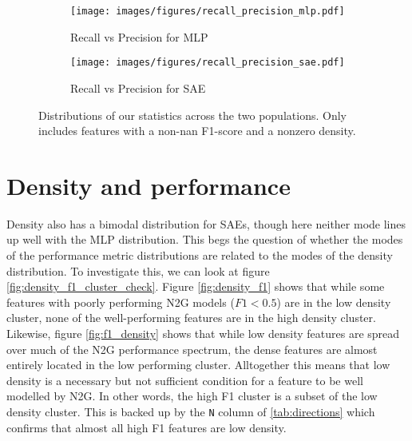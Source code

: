 \begin{figure}[h]
    \centering
    
    \begin{subfigure}[b]{0.45\textwidth}
        \centering
        \texttt{[image: images/figures/recall\_precision\_mlp.pdf]}
        \caption{Recall vs Precision for MLP}
        \label{fig:recall_precision_mlp}
    \end{subfigure}
    \begin{subfigure}[b]{0.45\textwidth}
        \centering
        \texttt{[image: images/figures/recall\_precision\_sae.pdf]}
        \caption{Recall vs Precision for SAE}
        \label{fig:recall_precision_sae}
    \end{subfigure}
    
    \caption{Distributions of our statistics across the two populations. Only includes features with a non-nan F1-score and a nonzero density.}
    \label{fig:recall_precision}
\end{figure}

\section{Density and performance}
Density also has a bimodal distribution for SAEs, though here neither mode lines up well with the MLP distribution.
This begs the question of whether the modes of the performance metric distributions are related to the modes of the density distribution.
To investigate this, we can look at figure \ref{fig:density_f1_cluster_check}.
Figure \ref{fig:density_f1} shows that while some features with poorly performing N2G models ($F1<0.5$) are in the low density cluster, none of the well-performing features are in the high density cluster.
Likewise, figure \ref{fig:f1_density} shows that while low density features are spread over much of the N2G performance spectrum, the dense features are almost entirely located in the low performing cluster.
Alltogether this means that low density is a necessary but not sufficient condition for a feature to be well modelled by N2G.
In other words, the high F1 cluster is a subset of the low density cluster.
This is backed up by the \texttt{N} column of \ref{tab:directions} which confirms that almost all high F1 features are low density.

